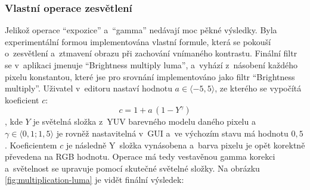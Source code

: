 \documentclass[11pt, a4paper, titlepage]{article}
\renewcommand{\uv}[1]{``#1''}
\begin{document}
\subsubsection{Vlastní operace zesvětlení}
Jelikož operace \uv{expozice} a~\uv{gamma} nedávají moc pěkné výsledky.
Byla experimentální formou implementována vlastní formule, která se pokouší o~zesvětlení a~ztmavení obrazu při zachování vnímaného kontrastu.
Finální filtr se v~aplikaci jmenuje \uv{Brightness multiply luma}, a~vyhází z~násobení každého pixelu konstantou, které jse pro srovnání implementováno jako filtr \uv{Brightness multiply}.
Uživatel v~editoru nastaví hodnotu $a \in \langle-5,5\rangle$, ze kterého se vypočítá koeficient $c$:
$$c=1+a\,(1 - Y^\gamma)$$
, kde $Y$ je světelná složka z~YUV barevného modelu\cite{wiki:YCbCr} daného pixelu a~$\gamma \in \langle0,1;1,5\rangle$ je rovněž nastavitelná v~GUI a~ve výchozím stavu má hodnotu $0,5$.
Koeficientem $c$ je následně Y~složka vynásobena a~barva pixelu je opět korektně převedena na RGB hodnotu.
Operace má tedy vestavěnou gamma korekci a~světelnost se upravuje pomocí skutečné světelné složky.
Na obrázku \ref{fig:multiplication-luma} je vidět finální výsledek:
\end{document}
